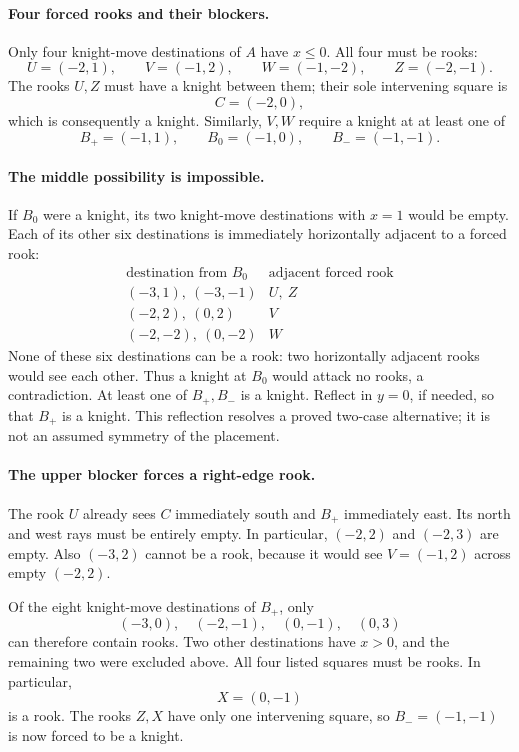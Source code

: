 \documentclass[11pt]{article}
\begin{document}
\paragraph{Four forced rooks and their blockers.}
Only four knight-move destinations of \(A\) have \(x\leq0\). All four must
be rooks:
\[
U=(-2,1),\qquad V=(-1,2),\qquad
W=(-1,-2),\qquad Z=(-2,-1).
\]
The rooks \(U,Z\) must have a knight between them; their sole intervening
square is
\[
C=(-2,0),
\]
which is consequently a knight. Similarly, \(V,W\) require a knight at
at least one of
\[
B_+=(-1,1),\qquad B_0=(-1,0),\qquad B_-=(-1,-1).
\]

\paragraph{The middle possibility is impossible.}
If \(B_0\) were a knight, its two knight-move destinations with
\(x=1\) would be empty. Each of its other six destinations is immediately
horizontally adjacent to a forced rook:
\[
\begin{array}{c|c}
\text{destination from }B_0&\text{adjacent forced rook}\\\hline
(-3,1),\ (-3,-1)&U,\ Z\\
(-2,2),\ (0,2)&V\\
(-2,-2),\ (0,-2)&W
\end{array}
\]
None of these six destinations can be a rook: two horizontally adjacent
rooks would see each other. Thus a knight at \(B_0\) would attack no
rooks, a contradiction. At least one of \(B_+,B_-\) is a knight. Reflect
in \(y=0\), if needed, so that \(B_+\) is a knight. This reflection resolves
a proved two-case alternative; it is not an assumed symmetry of the placement.

\paragraph{The upper blocker forces a right-edge rook.}
The rook \(U\) already sees \(C\) immediately south and \(B_+\) immediately
east. Its north and west rays must be entirely empty. In particular,
\((-2,2)\) and \((-2,3)\) are empty. Also \((-3,2)\) cannot be a rook,
because it would see \(V=(-1,2)\) across empty \((-2,2)\).

Of the eight knight-move destinations of \(B_+\), only
\[
(-3,0),\quad(-2,-1),\quad(0,-1),\quad(0,3)
\]
can therefore contain rooks. Two other destinations have \(x>0\), and
the remaining two were excluded above. All four listed squares must be
rooks. In particular,
\[
X=(0,-1)
\]
is a rook. The rooks \(Z,X\) have only one intervening square, so
\(B_-=(-1,-1)\) is now forced to be a knight.
\end{document}
